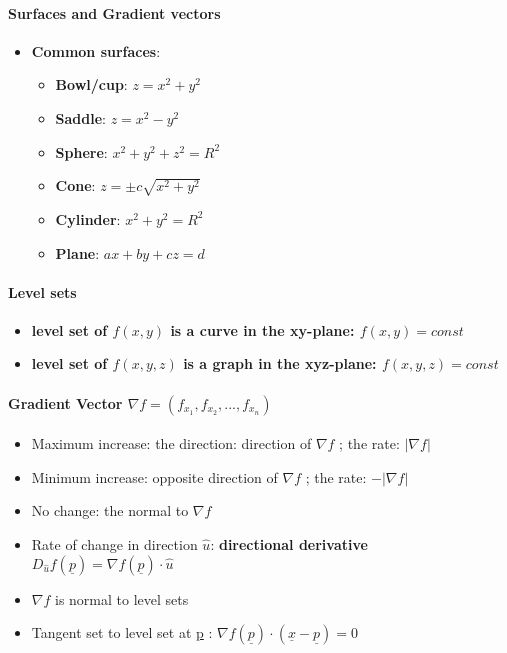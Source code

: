 \documentclass[8pt, twocolumn]{article}
\begin{document}
\paragraph{Surfaces and Gradient vectors}
	\begin{itemize}
		\item \textbf{Common surfaces}:
			\begin{multicols}{2}
			\begin{itemize}
				\item \textbf{Bowl/cup}: $z = x^2 + y^2$ 
				\item \textbf{Saddle}: $z = x^2 - y^2$ 
				\item \textbf{Sphere}: $x^2 + y^2 + z^2 = R^2$ 
				\item \textbf{Cone}: $z = \pm c\sqrt{x^2 + y^2}$
				\item \textbf{Cylinder}: $x^2 + y^2 = R^2$ 
				\item \textbf{Plane}: $ax + by + cz = d$
			\end{itemize}
			\end{multicols}
	\end{itemize}

\paragraph{Level sets}
			\begin{itemize}
				\item \textbf{level set of $f(x, y)$ is a curve in the xy-plane: $f(x, y) = const$}
				\item \textbf{level set of $f(x, y, z)$ is a graph in the xyz-plane: $f(x, y, z) = const$}
			\end{itemize}



\paragraph{Gradient Vector $\nabla f = (f_{x_1}, f_{x_2}, ..., f_{x_n}) $}
	\begin{itemize}
			\item Maximum increase: the direction: direction of $\nabla f$ ; the rate:  $|\nabla f|$
			\item Minimum increase: opposite direction of $\nabla f$ ; the rate:  $- |\nabla f|$
			\item No change: the normal to $\nabla f$
			\item Rate of change in direction $\hat{u}$: \textbf{directional derivative} $D_{\hat{u}}f(\underline{p}) = \nabla f(\underline{p})  \cdot \hat{u}$
			\item $\nabla f$ is normal to level sets 
			\item Tangent set to level set at \underline{p} : $\nabla f(\underline{p})  \cdot (\underline{x} - \underline{p}) = 0$
	\end{itemize} 
\end{document}
